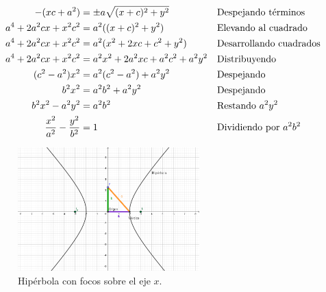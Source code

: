 \documentclass[letterpaper]{article}
\renewcommand{\*}{\cdot}
\theoremstyle{definition}
\begin{document}
	\begin{align*}
	-(xc + a^2)&= \pm a\sqrt{ (x+c)^2 + y^2} && \text{Despejando términos}\\ 
	a^4 + 2a^2cx + x^2c^2 &=  a^2((x+c)^2 + y^2) && \text{Elevando al cuadrado}\\ 
	a^4 + 2a^2cx + x^2c^2 &=  a^2(x^2 + 2xc +c^2 + y^2) && \text{Desarrollando cuadrados}\\ 
	a^4 + 2a^2cx + x^2c^2 &=  a^2x^2 + 2a^2xc +a^2c^2 + a^2y^2 && \text{Distribuyendo }\\ 
	(c^2 - a^2)x^2 &=  a^2(c^2-a^2) + a^2y^2 && \text{Despejando }\\
	b^2x^2 &=  a^2b^2 + a^2y^2 && \text{Despejando }\\
	b^2x^2 - a^2y^2 &=  a^2b^2 && \text{Restando  $ a^2y^2 $ }\\
	\dfrac{x^2}{a^2} - \dfrac{y^2}{b^2} &=  1 && \text{Dividiendo por $  a^2b^2 $ }\\
	\end{align*}
	\begin{figure}[ht!]
		\centering
		\includegraphics[width=7cm]{Hiperbola}
		\caption{Hipérbola con focos sobre el eje $x$.}
		\label{F1}
	\end{figure}
	
	
	
\end{document}
